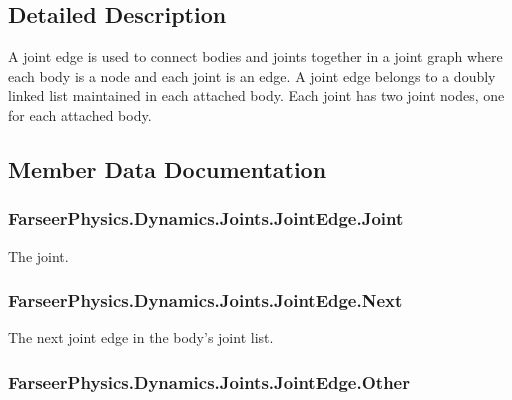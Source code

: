 \subsection{Detailed Description}
A joint edge is used to connect bodies and joints together in a joint graph where each body is a node and each joint is an edge. A joint edge belongs to a doubly linked list maintained in each attached body. Each joint has two joint nodes, one for each attached body. 



\subsection{Member Data Documentation}
\hypertarget{class_farseer_physics_1_1_dynamics_1_1_joints_1_1_joint_edge_af270df3c8097125c304de6bcf5227784}{
\subsubsection[{Joint}]{ Farseer\+Physics.\+Dynamics.\+Joints.\+Joint\+Edge.\+Joint}}\label{class_farseer_physics_1_1_dynamics_1_1_joints_1_1_joint_edge_af270df3c8097125c304de6bcf5227784}


The joint. 

\hypertarget{class_farseer_physics_1_1_dynamics_1_1_joints_1_1_joint_edge_aaab10255c100f9c03dfcfde1d0efa0cd}{
\subsubsection[{Next}]{ Farseer\+Physics.\+Dynamics.\+Joints.\+Joint\+Edge.\+Next}}\label{class_farseer_physics_1_1_dynamics_1_1_joints_1_1_joint_edge_aaab10255c100f9c03dfcfde1d0efa0cd}


The next joint edge in the body's joint list. 

\hypertarget{class_farseer_physics_1_1_dynamics_1_1_joints_1_1_joint_edge_a1138595512587173c57a22966781bd77}{
\subsubsection[{Other}]{ Farseer\+Physics.\+Dynamics.\+Joints.\+Joint\+Edge.\+Other}}\label{class_farseer_physics_1_1_dynamics_1_1_joints_1_1_joint_edge_a1138595512587173c57a22966781bd77}


